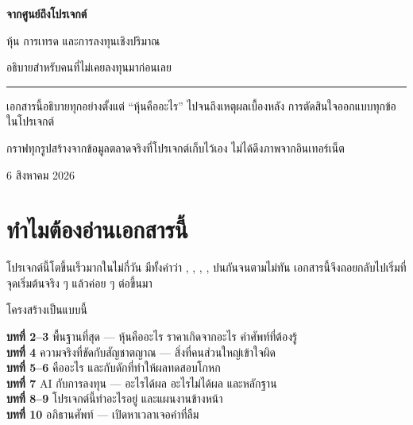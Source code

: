 \documentclass[11pt]{article}
\title{}
\date{}
\begin{document}
\begin{titlepage}
\centering
\vspace*{3cm}

{\sffamily\Huge\bfseries\color{blue} จากศูนย์ถึงโปรเจกต์\par}
\vspace{0.8cm}
{\sffamily\LARGE หุ้น การเทรด และการลงทุนเชิงปริมาณ\par}
\vspace{0.4cm}
{\sffamily\large\color{grey} อธิบายสำหรับคนที่ไม่เคยลงทุนมาก่อนเลย\par}

\vspace{2.5cm}
\rule{0.55\textwidth}{0.4pt}

\vspace{1.2cm}
\begin{minipage}{0.78\textwidth}
\centering\small
เอกสารนี้อธิบายทุกอย่างตั้งแต่ ``หุ้นคืออะไร'' ไปจนถึงเหตุผลเบื้องหลัง
การตัดสินใจออกแบบทุกข้อในโปรเจกต์ 

\vspace{0.5em}
กราฟทุกรูปสร้างจากข้อมูลตลาดจริงที่โปรเจกต์เก็บไว้เอง
ไม่ได้ดึงภาพจากอินเทอร์เน็ต
\end{minipage}

\vfill
{\small\color{grey} 6 สิงหาคม 2026\par}
\end{titlepage}

\tableofcontents
\newpage

\section{ทำไมต้องอ่านเอกสารนี้}

โปรเจกต์นี้โตขึ้นเร็วมากในไม่กี่วัน มีทั้งคำว่า , ,
, ,  ปนกันจนตามไม่ทัน
เอกสารนี้จึงถอยกลับไปเริ่มที่จุดเริ่มต้นจริง ๆ แล้วค่อย ๆ ต่อขึ้นมา

โครงสร้างเป็นแบบนี้

\begin{keypoint}
\textbf{บทที่ 2--3} \quad พื้นฐานที่สุด --- หุ้นคืออะไร ราคาเกิดจากอะไร คำศัพท์ที่ต้องรู้\\
\textbf{บทที่ 4} \quad ความจริงที่ขัดกับสัญชาตญาณ --- สิ่งที่คนส่วนใหญ่เข้าใจผิด\\
\textbf{บทที่ 5--6} \quad {} คืออะไร และกับดักที่ทำให้ผลทดสอบโกหก\\
\textbf{บทที่ 7} \quad AI กับการลงทุน --- อะไรได้ผล อะไรไม่ได้ผล และหลักฐาน\\
\textbf{บทที่ 8--9} \quad โปรเจกต์นี้ทำอะไรอยู่ และแผนงานข้างหน้า\\
\textbf{บทที่ 10} \quad อภิธานศัพท์ --- เปิดหาเวลาเจอคำที่ลืม
\end{keypoint}
\end{document}
